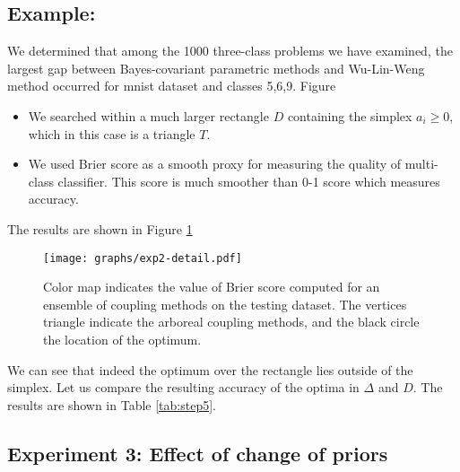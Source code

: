 \subsection{Example: }

We determined that among the 1000 three-class problems we have examined, the largest gap between Bayes-covariant parametric methods and Wu-Lin-Weng method occurred for mnist dataset and classes 5,6,9. Figure 

\begin{itemize}
	\item We searched within a much larger rectangle $D$ containing the simplex $a_i\geq 0$, which in this case is a triangle $T$.
	\item We used Brier score as a smooth proxy for measuring the quality of multi-class classifier. This score is much smoother than 0-1 score which measures accuracy.
\end{itemize}

The results are shown in Figure \ref{fig:score}


\begin{figure}[!ht]
	\texttt{[image: graphs/exp2-detail.pdf]}
	\caption{Color map indicates the value of Brier score computed for an ensemble of coupling methods on the testing dataset. The vertices triangle indicate the arboreal coupling methods, and the black circle the location of the optimum.}
	\label{fig:score}
\end{figure}

We can see that indeed the optimum over the rectangle lies outside of the simplex. Let us compare the resulting accuracy of the optima in $\Delta$ and $D$. The results are shown in Table \ref{tab:step5}.



\subsection{Experiment 3: Effect of change of priors}  \label{sec:exp3}



